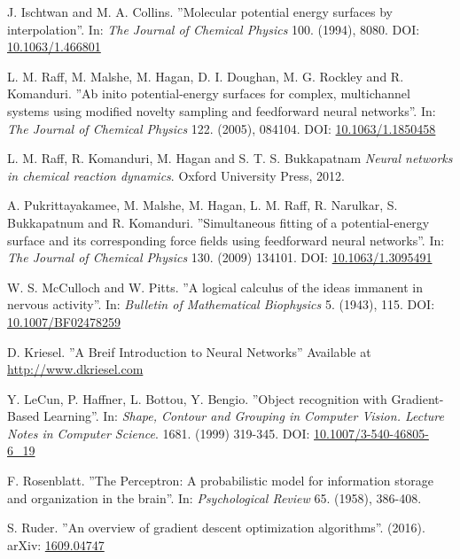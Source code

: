 \documentclass[twoside,english]{uiofysmaster}
\begin{document}
\begin{thebibliography}{56}
 J. Ischtwan and M. A. Collins.
 ''Molecular potential energy surfaces by interpolation''.
 In: \textit{The Journal of Chemical Physics} 100. (1994), 8080.
 DOI: \href{http://dx.doi.org/10.1063/1.466801}{10.1063/1.466801}
 
 L. M. Raff, M. Malshe, M. Hagan, D. I. Doughan, M. G. Rockley and R. Komanduri.
 ''Ab inito potential-energy surfaces for complex, multichannel systems using modified
 novelty sampling and feedforward neural networks''. 
 In: \textit{The Journal of Chemical Physics} 122. (2005), 084104. 
 DOI: \href{http://dx.doi.org/10.1063/1.1850458}{10.1063/1.1850458}
 
 L. M. Raff, R. Komanduri, M. Hagan and S. T. S. Bukkapatnam 
 \textit{Neural networks in chemical reaction dynamics}.
 Oxford University Press, 2012.
 
 A. Pukrittayakamee, M. Malshe, M. Hagan, L. M. Raff, R. Narulkar, 
 S. Bukkapatnum and R. Komanduri. 
 ''Simultaneous fitting of a potential-energy surface and its corresponding force fields
 using feedforward neural networks''. 
 In: \textit{The Journal of Chemical Physics} 130. (2009) 134101.
 DOI: \href{http://dx.doi.org/10.1063/1.3095491}{10.1063/1.3095491}
 
 W. S. McCulloch and W. Pitts.
 ''A logical calculus of the ideas immanent in nervous activity''.
 In: \textit{Bulletin of Mathematical Biophysics} 5. (1943), 115. 
 DOI: \href{http://dx.doi.org/10.1007/BF02478259}{10.1007/BF02478259}
 
 D. Kriesel. 
 ''A Breif Introduction to Neural Networks''
 Available at \href{http://www.dkriesel.com}{http://www.dkriesel.com}
 
 Y. LeCun, P. Haffner, L. Bottou, Y. Bengio. 
 ''Object recognition with Gradient-Based Learning''.
 In: \textit{Shape, Contour and Grouping in Computer Vision. Lecture Notes in Computer Science}.
 1681. (1999) 319-345. 
 DOI: \href{http://dx.doi.org/10.1007/3-540-46805-6_19}{10.1007/3-540-46805-6\_19}
 
 F. Rosenblatt. 
 ''The Perceptron: A probabilistic model for information storage and organization in the brain''.
 In: \textit{Psychological Review} 65. (1958), 386-408. 
 
 S. Ruder.
 ''An overview of gradient descent optimization algorithms''. 
 (2016). 
 arXiv: \href{https://arxiv.org/abs/1609.04747}{1609.04747}
 
 
\end{thebibliography}
\end{document}
